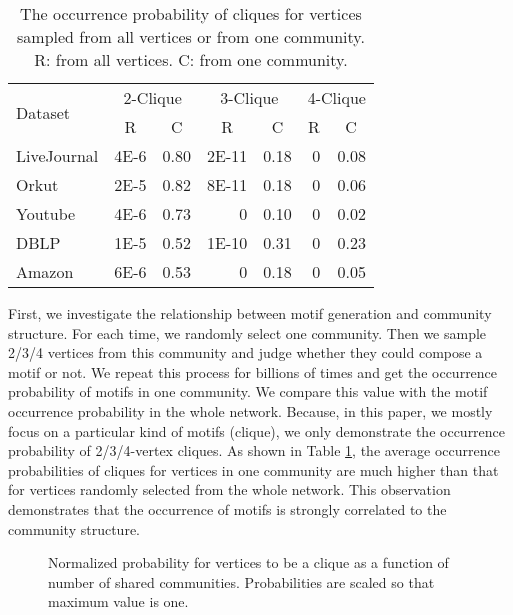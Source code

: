\documentclass[sigconf]{acmart}
\begin{document}
\begin{table}[]
\centering
\caption{The occurrence probability of cliques for vertices sampled from all vertices or from one community. R: from all vertices. C: from one community.}
\label{tab:observation-probability}
\begin{tabular}{|l|r|r|r|r|r|r|}
\hline
\multirow{2}{*}{Dataset}  & \multicolumn{2}{c|}{2-Clique} & \multicolumn{2}{c|}{3-Clique} & \multicolumn{2}{c|}{4-Clique} \\ \cline{2-7}
             & \multicolumn{1}{c|}{R}    & \multicolumn{1}{c|}{C}  & \multicolumn{1}{c|}{R}    & \multicolumn{1}{c|}{C}  & \multicolumn{1}{c|}{R}   & \multicolumn{1}{c|}{C}   \\ \hline
\hline
LiveJournal  & 4E-6   & 0.80      & 2E-11   & 0.18      & 0        & 0.08       \\ \hline
Orkut        & 2E-5   & 0.82      & 8E-11   & 0.18      & 0        & 0.06       \\ \hline
Youtube      & 4E-6   & 0.73      & 0       & 0.10      & 0        & 0.02       \\ \hline
DBLP         & 1E-5   & 0.52      & 1E-10   & 0.31      & 0        & 0.23       \\ \hline
Amazon       & 6E-6   & 0.53      & 0       & 0.18      & 0        & 0.05       \\ \hline
\end{tabular}
\end{table}

First, we investigate the relationship between motif generation and community structure.
For each time, we randomly select one community.
Then we sample 2/3/4 vertices from this community and judge whether they could compose a motif or not.
We repeat this process for billions of times and get the occurrence probability of motifs in one community.
We compare this value with the motif occurrence  probability in the whole network.
Because, in this paper, we mostly focus on a particular kind of motifs (clique), we only demonstrate the occurrence probability of 2/3/4-vertex cliques.
As shown in Table \ref{tab:observation-probability}, the average occurrence probabilities of cliques for vertices in one community are much higher than that for vertices randomly selected from the whole network.
This observation demonstrates that the occurrence of motifs is strongly correlated to the community structure.

\begin{figure}[tbp]
\centering
{}
\caption{Normalized probability for vertices to be a clique as a function of number of shared communities. Probabilities are scaled so that maximum value is one.}
\label{fig:clique-probability}
\end{figure}
\end{document}

